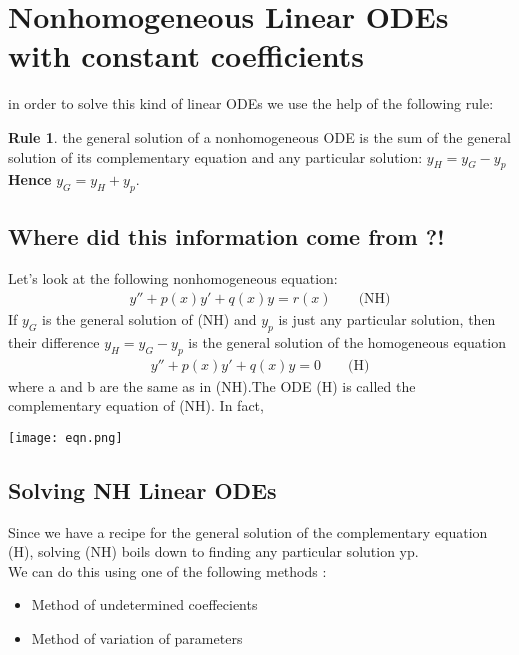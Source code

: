 \documentclass[11pt]{article}
\theoremstyle{definition}
\newtheorem{reg}{Rule}
\begin{document}
 \section{Nonhomogeneous Linear ODEs with constant coefficients}
in order to solve this kind of linear ODEs we use the help of the following rule:
\begin{reg}
the general solution of a nonhomogeneous
ODE is the sum of the general solution of its complementary equation and any particular solution: $y_H = y_G - y_p$ \textbf{Hence} $y_G = y_H + y_p$.
\end{reg}
\subsection{Where did this information come from ?! }
Let's look at the following nonhomogeneous equation:
\begin{align*}
    y''+p(x)y'+q(x)y=r(x) && \text{ (NH)}
\end{align*}
If $y_G$ is the general solution of (NH) and $y_p$ is just any particular solution, then their difference $y_H = y_G - y_p$ is the general solution of the homogeneous equation
\begin{align*}
    y''+p(x)y'+q(x)y=0 && \text{ (H)}
\end{align*}
where a and b are the same as in (NH).The ODE (H) is called the complementary equation of (NH).
In fact,
\begin{center}
    \texttt{[image: eqn.png]}
\end{center}
\subsection{Solving NH Linear ODEs}
Since we have a recipe for the general solution of the complementary equation (H), solving (NH) boils down to finding any particular solution yp.\\
We can do this using one of the following methods :
\begin{itemize}
    \item Method of undetermined coeffecients
    \item Method of variation of parameters
\end{itemize}
\end{document}

